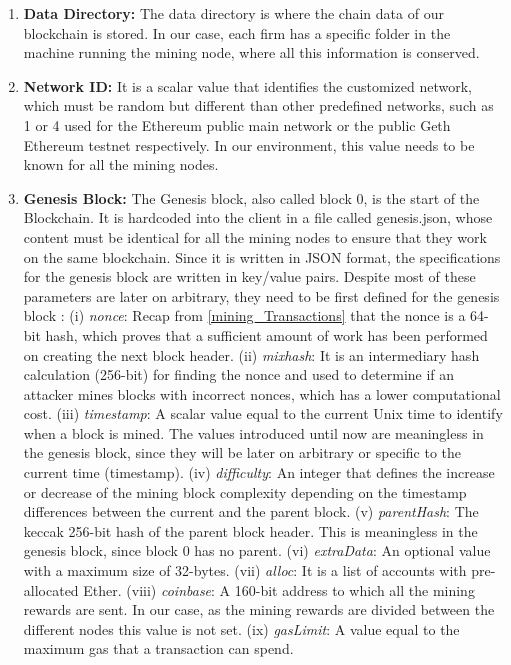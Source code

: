 \begin{enumerate}
	
	\item \textbf{Data Directory:} The data directory is where the chain data of our blockchain is stored. In our case, each firm has a specific folder in the machine running the mining node, where all this information is conserved.
	\item \textbf{Network ID:} It is a scalar value that identifies the customized network, which must be random but different than other predefined networks, such as 1 or 4 used for the Ethereum public main network or the public Geth Ethereum testnet respectively. In our environment, this value needs to be known for all the mining nodes.
	\item \textbf{Genesis Block:} The Genesis block, also called block 0, is the start of the Blockchain. It is hardcoded into the client in a file called genesis.json, whose content must be identical for all the mining nodes to ensure that they work on the same blockchain. Since it is written in JSON format, the specifications for the genesis block are written in key/value pairs. Despite most of these parameters are later on arbitrary, they need to be first defined for the genesis block \citep{GenesisParams}: (i) \textit{nonce}: Recap from \ref{mining_Transactions} that the nonce is a 64-bit hash, which proves that a sufficient amount of work has been performed on creating the next block header. (ii) \textit{mixhash}: It is an intermediary hash calculation (256-bit) for finding the nonce and used to determine if an attacker mines blocks with incorrect nonces, which has a lower computational cost. (iii) \textit{timestamp}: A scalar value equal to the current Unix time to identify when a block is mined. The values introduced until now are meaningless in the genesis block, since they will be later on arbitrary or specific to the current time (timestamp). (iv) \textit{difficulty}: An integer that defines the increase or decrease of the mining block complexity depending on the timestamp differences between the current and the parent block. (v) \textit{parentHash}: The keccak 256-bit hash of the parent block header. This is meaningless in the genesis block, since block 0 has no parent. (vi) \textit{extraData}: An optional value with a maximum size of 32-bytes. (vii) \textit{alloc}: It is a list of accounts with pre-allocated Ether. (viii) \textit{coinbase}: A 160-bit address to which all the mining rewards are sent. In our case, as the mining rewards are divided between the different nodes this value is not set. (ix) \textit{gasLimit}: A value equal to the maximum gas that a transaction can spend.

\end{enumerate}

